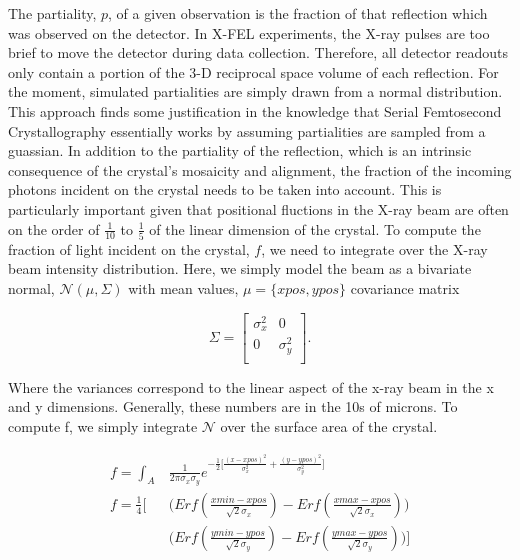 \documentclass{report}
\begin{document}
The partiality, $p$, of a given observation is the fraction of that reflection which was observed on the detector. 
In X-FEL experiments, the X-ray pulses are too brief to move the detector during data collection. 
Therefore, all detector readouts only contain a portion of the 3-D reciprocal space volume of each reflection. 
For the moment, simulated partialities are simply drawn from a normal distribution. 
This approach finds some justification in the knowledge that Serial Femtosecond Crystallography essentially works by assuming partialities are sampled from a guassian. 
In addition to the partiality of the reflection, which is an intrinsic consequence of the crystal's mosaicity and alignment, the fraction of the incoming photons incident on the crystal needs to be taken into account. 
This is particularly important given that positional fluctions in the X-ray beam are often on the order of $\frac {1} {10}$ to $\frac {1} {5}$ of the linear dimension of the crystal. 
To compute the fraction of light incident on the crystal, $f$, we need to integrate over the X-ray beam intensity distribution. 
Here, we simply model the beam as a bivariate normal, $\mathcal{N}(\mu, \Sigma)$ with mean values, $\mu=\{xpos, ypos\}$ covariance matrix

\begin{equation}
\Sigma = 
\begin{bmatrix}
    \sigma_x^2 & 0 \\
    0 & \sigma_y^2 \\
\end{bmatrix}.
\end{equation}

Where the variances correspond to the linear aspect of the x-ray beam in the x and y dimensions. Generally, these numbers are in the 10s of microns. 
To compute f, we simply integrate $\mathcal{N}$ over the surface area of the crystal. 

\begin{equation}
\begin{aligned}
f = \int_A &\frac {1} {2\pi \sigma_x \sigma_y} e^{-\frac {1} {2} \big[ \frac {(x - xpos)^2}{\sigma_x^2} + \frac {(y - ypos)^2}{\sigma_y^2} \big]} \\
f = \frac {1} {4} \bigg[ &\bigg( Erf (\frac {xmin - xpos} {\sqrt {2} \sigma_x}) - Erf (\frac {xmax - xpos} {\sqrt {2} \sigma_x} ) \bigg)  \\
 &\bigg( Erf ( \frac {ymin - ypos} {\sqrt {2} \sigma_y}) - Erf (\frac {ymax - ypos} {\sqrt {2} \sigma_y}) \bigg)  \bigg]
\end{aligned}
\end{equation}
\end{document}
